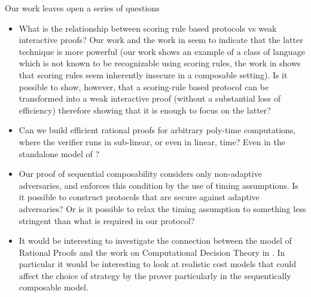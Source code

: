 \documentclass{llncs}
\begin{document}
Our work leaves open a series of questions
\begin{itemize}
\item What is the relationship between scoring rule based protocols vs weak interactive proofs? Our work and the work in \cite{cg15} seem to indicate that the latter technique is more powerful (our work shows an example of a class of language which is not known to be recognizable using scoring rules, the work in \cite{cg15} shows that scoring rules seem inherently insecure in a composable setting). Is it possible to show, however, that a scoring-rule based protocol can be transformed into a weak interactive proof (without a substantial loss of efficiency) therefore showing that it is enough to focus on the latter?

\item Can we build efficient rational proofs for arbitrary poly-time computations, where the verifier runs in sub-linear, or even in linear, time? Even in the standalone model of \cite{am}?

\item Our proof of sequential composability considers only non-adaptive adversaries, and enforces this condition by the use of timing assumptions. Is it possible to construct protocols that are secure against adaptive adversaries? Or is it possible to relax the timing assumption to something less stringent than what is required in our protocol?

\item It would be interesting to investigate the connection between the model of Rational Proofs and the work on Computational Decision Theory in  \cite{halpern2011don}. In particular it would be interesting to look at realistic cost models that could affect the choice of strategy by the prover particularly in the sequentically composable model. 
\end{itemize}




    


\end{document}
